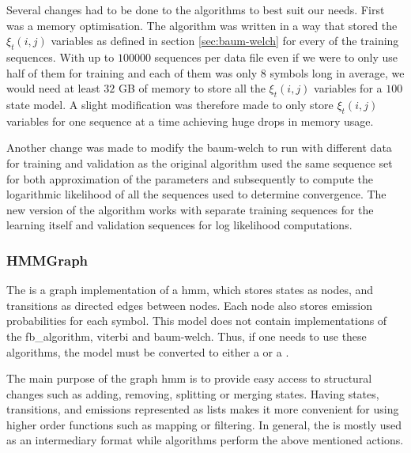 Several changes had to be done to the algorithms to best suit our needs. First was a memory optimisation. The algorithm was written in a way that stored the $\xi_t(i,j)$ variables as defined in section \ref{sec:baum-welch} for every of the training sequences. With up to $100000$ sequences per data file even if we were to only use half of them for training and each of them was only $8$ symbols long in average, we would need at least $32$ GB of memory to store all the $\xi_t(i,j)$ variables for a $100$ state model. A slight modification was therefore made to only store $\xi_t(i,j)$ variables for one sequence at a time achieving huge drops in memory usage.

Another change was made to modify the \gls{baum-welch} to run with different data for training and validation as the original algorithm used the same sequence set for both approximation of the parameters and subsequently to compute the logarithmic likelihood of all the sequences used to determine convergence. The new version of the algorithm works with separate training sequences for the learning itself and validation sequences for log likelihood computations.



\subsubsection{HMMGraph}

The is a graph implementation of a \gls{hmm}, which stores states as nodes, and transitions as directed edges between nodes. Each node also stores emission probabilities for each symbol. This model does not contain implementations of the \gls{fb_algorithm}, \gls{viterbi} and \gls{baum-welch}.
Thus, if one needs to use these algorithms, the model must be converted to either a  or a .

The main purpose of the graph \gls{hmm} is to provide easy access to structural changes such as adding, removing, splitting or merging states. Having states, transitions, and emissions represented as lists makes it more convenient for using higher order functions such as mapping or filtering.
In general, the  is mostly used as an intermediary format while algorithms perform the above mentioned actions.

